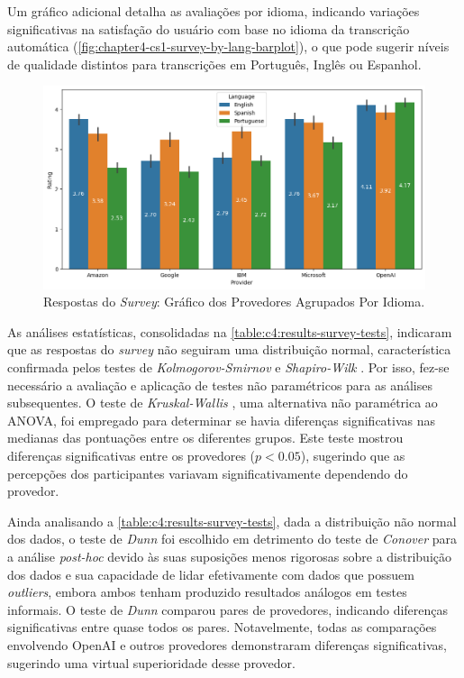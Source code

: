 Um gráfico adicional detalha as avaliações por idioma, indicando variações significativas na satisfação do usuário com base no idioma da transcrição automática (\autoref{fig:chapter4-cs1-survey-by-lang-barplot}), o que pode sugerir níveis de qualidade distintos para transcrições em Português, Inglês ou Espanhol.

\begin{figure}[htb]
\centering
\caption{Respostas do \textit{Survey}: Gráfico dos Provedores Agrupados Por Idioma.}
\label{fig:chapter4-cs1-survey-by-lang-barplot}
\includegraphics[width=1\textwidth]{images/chapter4-cs1-survey-by-lang-barplot.png}
\end{figure}

As análises estatísticas, consolidadas na \autoref{table:c4:results-survey-tests}, indicaram que as respostas do \textit{survey} não seguiram uma distribuição normal, característica confirmada pelos testes de \textit{Kolmogorov-Smirnov} \cite{Kolmogorov1933,Smirnov1948} e \textit{Shapiro-Wilk} \cite{Shapiro1965}. Por isso, fez-se necessário a avaliação e aplicação de testes não paramétricos para as análises subsequentes. O teste de \textit{Kruskal-Wallis} \cite{Kruskal1952}, uma alternativa não paramétrica ao ANOVA, foi empregado para determinar se havia diferenças significativas nas medianas das pontuações entre os diferentes grupos. Este teste mostrou diferenças significativas entre os provedores (\ensuremath{p < 0.05}), sugerindo que as percepções dos participantes variavam significativamente dependendo do provedor.

Ainda analisando a \autoref{table:c4:results-survey-tests}, dada a distribuição não normal dos dados, o teste de \textit{Dunn} \cite{Dunn1964} foi escolhido em detrimento do teste de \textit{Conover} \cite{Conover1999} para a análise \textit{post-hoc} devido às suas suposições menos rigorosas sobre a distribuição dos dados e sua capacidade de lidar efetivamente com dados que possuem \textit{outliers}, embora ambos tenham produzido resultados análogos em testes informais. O teste de \textit{Dunn} comparou pares de provedores, indicando diferenças significativas entre quase todos os pares. Notavelmente, todas as comparações envolvendo OpenAI e outros provedores demonstraram diferenças significativas, sugerindo uma virtual superioridade desse provedor.

